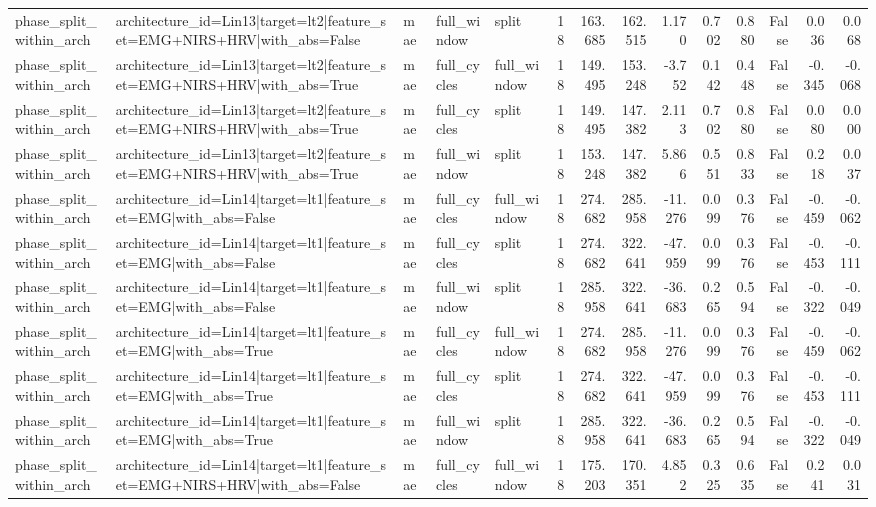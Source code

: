 \begin{table}
\begin{tabular}{lllllrrrrrrrrr}
phase_split_within_arch & architecture_id=Lin13|target=lt2|feature_set=EMG+NIRS+HRV|with_abs=False & mae & full_window & split & 18 & 163.685 & 162.515 & 1.170 & 0.702 & 0.880 & False & 0.036 & 0.068 \\
phase_split_within_arch & architecture_id=Lin13|target=lt2|feature_set=EMG+NIRS+HRV|with_abs=True & mae & full_cycles & full_window & 18 & 149.495 & 153.248 & -3.752 & 0.142 & 0.448 & False & -0.345 & -0.068 \\
phase_split_within_arch & architecture_id=Lin13|target=lt2|feature_set=EMG+NIRS+HRV|with_abs=True & mae & full_cycles & split & 18 & 149.495 & 147.382 & 2.113 & 0.702 & 0.880 & False & 0.080 & 0.000 \\
phase_split_within_arch & architecture_id=Lin13|target=lt2|feature_set=EMG+NIRS+HRV|with_abs=True & mae & full_window & split & 18 & 153.248 & 147.382 & 5.866 & 0.551 & 0.833 & False & 0.218 & 0.037 \\
phase_split_within_arch & architecture_id=Lin14|target=lt1|feature_set=EMG|with_abs=False & mae & full_cycles & full_window & 18 & 274.682 & 285.958 & -11.276 & 0.099 & 0.376 & False & -0.459 & -0.062 \\
phase_split_within_arch & architecture_id=Lin14|target=lt1|feature_set=EMG|with_abs=False & mae & full_cycles & split & 18 & 274.682 & 322.641 & -47.959 & 0.099 & 0.376 & False & -0.453 & -0.111 \\
phase_split_within_arch & architecture_id=Lin14|target=lt1|feature_set=EMG|with_abs=False & mae & full_window & split & 18 & 285.958 & 322.641 & -36.683 & 0.265 & 0.594 & False & -0.322 & -0.049 \\
phase_split_within_arch & architecture_id=Lin14|target=lt1|feature_set=EMG|with_abs=True & mae & full_cycles & full_window & 18 & 274.682 & 285.958 & -11.276 & 0.099 & 0.376 & False & -0.459 & -0.062 \\
phase_split_within_arch & architecture_id=Lin14|target=lt1|feature_set=EMG|with_abs=True & mae & full_cycles & split & 18 & 274.682 & 322.641 & -47.959 & 0.099 & 0.376 & False & -0.453 & -0.111 \\
phase_split_within_arch & architecture_id=Lin14|target=lt1|feature_set=EMG|with_abs=True & mae & full_window & split & 18 & 285.958 & 322.641 & -36.683 & 0.265 & 0.594 & False & -0.322 & -0.049 \\
phase_split_within_arch & architecture_id=Lin14|target=lt1|feature_set=EMG+NIRS+HRV|with_abs=False & mae & full_cycles & full_window & 18 & 175.203 & 170.351 & 4.852 & 0.325 & 0.635 & False & 0.241 & 0.031 \\

\end{tabular}
\end{table}
